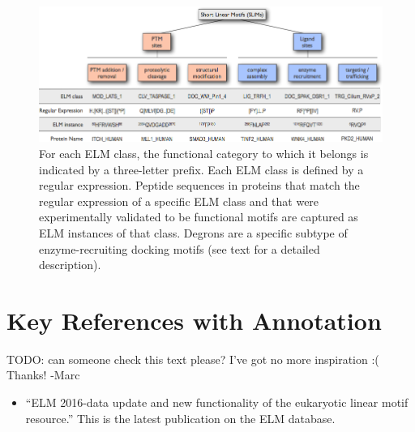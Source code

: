 \documentclass[12pt]{article}
\newcounter{proto}
\begin{document}
	\begin{figure}[h!]
	\centering
	\includegraphics[width=\textwidth]{Figures/Introduction/functional_classification_of_SLiMs.png}
	\caption{
	For each ELM class, the
	functional category to which it belongs is indicated by a three-letter prefix.
	Each ELM class is defined by a regular expression. Peptide sequences in
	proteins that match the regular expression of a specific ELM class and that
	were experimentally validated to be functional motifs are captured as ELM
	instances of that class. Degrons are a specific subtype of enzyme-recruiting
	docking motifs (see text for a detailed description).
	}
	\label{fig:SLiMclasses}
	\end{figure}



\section*{Key References with Annotation}
\label{sec:key-references-with-annotation}

TODO: can someone check this text please? I've got no more inspiration :( Thanks! -Marc

\begin{itemize}
\item ``ELM 2016-data update and new functionality of the
	eukaryotic linear motif resource.'' \citep{26615199}
	This is the latest publication on the ELM database.
\end{itemize}
\end{document}
